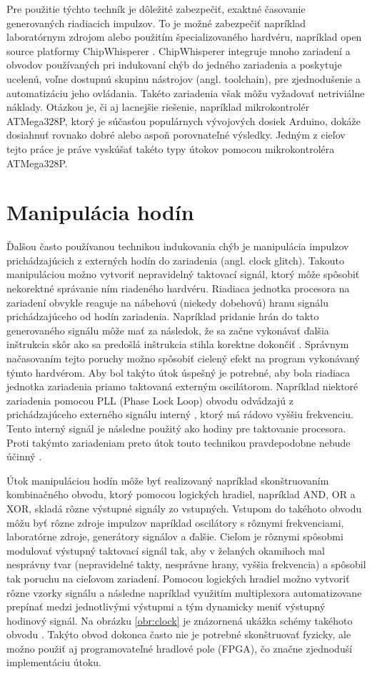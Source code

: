 Pre použitie týchto techník je dôležité zabezpečiť, exaktné časovanie generovaných riadiacich impulzov. To je možné zabezpečiť napríklad laboratórnym zdrojom alebo použitím špecializovaného hardvéru, napríklad open source platformy ChipWhisperer \cite{chipwhisperer}. ChipWhisperer integruje mnoho zariadení a obvodov používaných pri indukovaní chýb do jedného zariadenia a poskytuje ucelenú, voľne dostupnú skupinu nástrojov (angl. toolchain), pre zjednodušenie a automatizáciu jeho ovládania. Takéto zariadenia však môžu vyžadovať netriviálne náklady. Otázkou je, či aj lacnejšie riešenie, napríklad mikrokontrolér ATMega328P, ktorý je súčasťou populárnych vývojových dosiek Arduino, dokáže dosiahnuť rovnako dobré alebo aspoň porovnateľné výsledky. Jedným z cieľov tejto práce je práve vyskúšať takéto typy útokov pomocou mikrokontroléra ATMega328P.

\section{Manipulácia hodín} \label{kap1:sek:manipulaciaHodin}
Ďalšou často používanou technikou indukovania chýb je manipulácia impulzov prichádzajúcich z externých hodín do zariadenia (angl. clock glitch). Takouto manipuláciou možno vytvoriť nepravidelný taktovací signál, ktorý môže spôsobiť nekorektné správanie ním riadeného hardvéru. Riadiaca jednotka procesora na zariadení obvykle reaguje na nábehovú (niekedy dobehovú) hranu signálu prichádzajúceho od hodín zariadenia. Napríklad pridanie hrán do takto generovaného signálu môže mať za následok, že sa začne vykonávať ďalšia inštrukcia skôr ako sa predošlá inštrukcia stihla korektne dokončiť \cite{clock}. Správnym načasovaním tejto poruchy možno spôsobiť cielený efekt na program vykonávaný týmto hardvérom. Aby bol takýto útok úspešný je potrebné, aby bola riadiaca jednotka zariadenia priamo taktovaná externým oscilátorom. Napríklad niektoré zariadenia pomocou PLL (Phase Lock Loop) obvodu odvádzajú z prichádzajúceho externého signálu interný \cite{stmReference}, ktorý má rádovo vyššiu frekvenciu. Tento interný signál je následne použitý ako hodiny pre taktovanie procesora. Proti takýmto zariadeniam preto útok touto technikou pravdepodobne nebude účinný \cite{crowbars}.

Útok manipuláciou hodín môže byť realizovaný napríklad skonštruovaním kombinačného obvodu, ktorý pomocou logických hradiel, napríklad AND, OR a XOR, skladá rôzne výstupné signály zo vstupných. Vstupom do takéhoto obvodu môžu byť rôzne zdroje impulzov napríklad oscilátory s rôznymi frekvenciami, laboratórne zdroje, generátory signálov a ďalšie. Cieľom je rôznymi spôsobmi modulovať výstupný taktovací signál tak, aby v želaných okamihoch mal nesprávny tvar (nepravidelné takty, nesprávne hrany, vyššia frekvencia) a spôsobil tak poruchu na cieľovom zariadení. Pomocou logických hradiel možno vytvoriť rôzne vzorky signálu a následne napríklad využitím multiplexora automatizovane prepínať medzi jednotlivými výstupmi a tým dynamicky meniť výstupný hodinový signál. Na obrázku \ref{obr:clock} je znázornená ukážka schémy takéhoto obvodu \cite{clockCircuit}. Takýto obvod dokonca často nie je potrebné skonštruovať fyzicky, ale možno použiť aj programovateľné hradlové pole (FPGA), čo značne zjednoduší implementáciu útoku.

